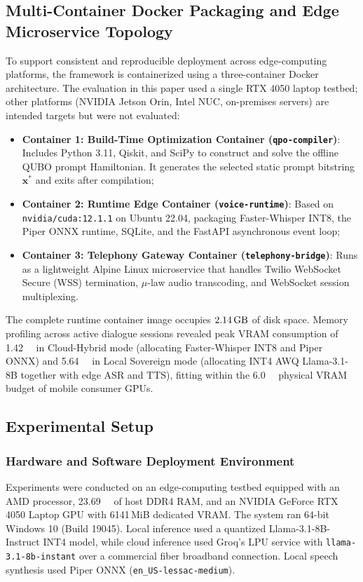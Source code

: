 \documentclass[review,12pt,times,authoryear]{elsarticle}
\theoremstyle{definition}
\begin{document}
\subsection{Multi-Container Docker Packaging and Edge Microservice Topology}
To support consistent and reproducible deployment across edge-computing platforms, the framework is containerized using a three-container Docker architecture. The evaluation in this paper used a single RTX 4050 laptop testbed; other platforms (NVIDIA Jetson Orin, Intel NUC, on-premises servers) are intended targets but were not evaluated:
\begin{itemize}[noitemsep]
  \item \textbf{Container 1: Build-Time Optimization Container (\texttt{qpo-compiler})}: Includes Python 3.11, Qiskit, and SciPy to construct and solve the offline QUBO prompt Hamiltonian. It generates the selected static prompt bitstring $\bm{x}^*$ and exits after compilation;
  \item \textbf{Container 2: Runtime Edge Container (\texttt{voice-runtime})}: Based on \texttt{nvidia/cuda:12.1.1} on Ubuntu 22.04, packaging Faster-Whisper INT8, the Piper ONNX runtime, SQLite, and the FastAPI asynchronous event loop;
  \item \textbf{Container 3: Telephony Gateway Container (\texttt{telephony-bridge})}: Runs as a lightweight Alpine Linux microservice that handles Twilio WebSocket Secure (WSS) termination, $\mu$-law audio transcoding, and WebSocket session multiplexing.
\end{itemize}
The complete runtime container image occupies $\SI{2.14}{\giga\byte}$ of disk space. Memory profiling across active dialogue sessions revealed peak VRAM consumption of \SI{1.42}{\giga\byte} in Cloud-Hybrid mode (allocating Faster-Whisper INT8 and Piper ONNX) and \SI{5.64}{\giga\byte} in Local Sovereign mode (allocating INT4 AWQ Llama-3.1-8B together with edge ASR and TTS), fitting within the \SI{6.0}{\giga\byte} physical VRAM budget of mobile consumer GPUs.

\subsection{Experimental Setup}
\label{sec:experimental}

\subsubsection{Hardware and Software Deployment Environment}
Experiments were conducted on an edge-computing testbed equipped with an AMD processor, \SI{23.69}{\giga\byte} of host DDR4 RAM, and an NVIDIA GeForce RTX 4050 Laptop GPU with 6141\,MiB dedicated VRAM. The system ran 64-bit Windows 10 (Build 19045). Local inference used a quantized Llama-3.1-8B-Instruct INT4 model, while cloud inference used Groq's LPU service with \texttt{llama-3.1-8b-instant} over a commercial fiber broadband connection. Local speech synthesis used Piper ONNX (\texttt{en\_US-lessac-medium}).
\end{document}
